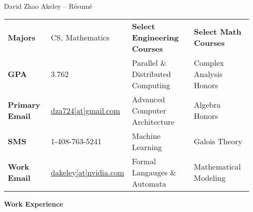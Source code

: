 \documentclass[11pt]{article}
\makeatletter
\newcommand{\email}[2]{{\small \color{webColor} \textsf{\href{mailto:#1@#2}{#1[at]#2}}}}
\newcommand{\myTitle}[1]{{ \vspace{2mm} \large \color{titleColor} \hspace{-12mm} \textbf{\textsf{#1}} \vspace{2mm}}}
\newcommand{\myKey}[1]{{\color{keyColor}\textbf{#1}}}
\newcommand{\GPA}{3.762}
\makeatother
\begin{document}
\reversemarginpar
\begin{center}
\textsf{ \LARGE  \color{titleColor} David Zhao Akeley -- Résumé }


\end{center}

\begin{tabular}{l l|l l}
\myKey{Majors} & CS, Mathematics
 & \myKey{Select Engineering Courses} & \myKey{Select Math Courses} \\
\myKey{GPA} & \GPA & Parallel \& Distributed Computing & Complex Analysis Honors \\
\myKey{Primary Email} & \email{dza724}{gmail.com}
 & Advanced Computer Architecture & Algebra Honors \\
\myKey{SMS} & 1-408-763-5241
 & Machine Learning & Galois Theory \\
\myKey{Work Email} & \email{dakeley}{nvidia.com}
 & Formal Langauges \& Automata & Mathematical Modeling
\end{tabular}

\vspace{0.1mm}

\myTitle{Work Experience}
\end{document}
